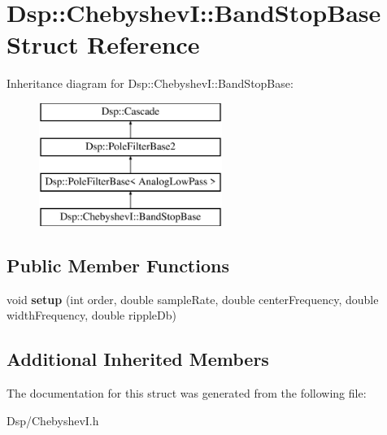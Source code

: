 \hypertarget{structDsp_1_1ChebyshevI_1_1BandStopBase}{\section{Dsp\-:\-:Chebyshev\-I\-:\-:Band\-Stop\-Base Struct Reference}
\label{structDsp_1_1ChebyshevI_1_1BandStopBase}
}
Inheritance diagram for Dsp\-:\-:Chebyshev\-I\-:\-:Band\-Stop\-Base\-:\begin{figure}[H]
\begin{center}
\leavevmode
\includegraphics[height=4.000000cm]{structDsp_1_1ChebyshevI_1_1BandStopBase}
\end{center}
\end{figure}
\subsection*{Public Member Functions}
\begin{DoxyCompactItemize}
\item 
\hypertarget{structDsp_1_1ChebyshevI_1_1BandStopBase_a32b2a5e6c877b71ccc24cf32cef01636}{void {\bfseries setup} (int order, double sample\-Rate, double center\-Frequency, double width\-Frequency, double ripple\-Db)}\label{structDsp_1_1ChebyshevI_1_1BandStopBase_a32b2a5e6c877b71ccc24cf32cef01636}

\end{DoxyCompactItemize}
\subsection*{Additional Inherited Members}


The documentation for this struct was generated from the following file\-:\begin{DoxyCompactItemize}
\item 
Dsp/Chebyshev\-I.\-h\end{DoxyCompactItemize}
